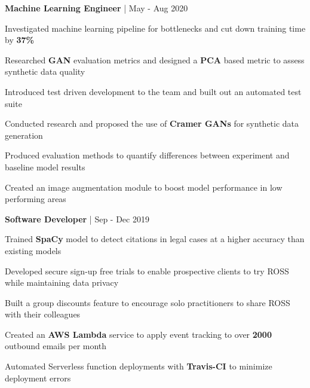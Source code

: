 


\begin{cventries}


\cventry
{\textbf{Machine Learning Engineer} | \color{awesome}{PerkinElmer}}
{May - Aug 2020} %
{ %
\begin{cvitems}
\item {Investigated machine learning pipeline for bottlenecks and cut down training time by \textbf{37\%}}
\item {Researched \textbf{GAN} evaluation metrics and designed a \textbf{PCA} based metric to assess synthetic data quality}
\item {Introduced test driven development to the team and built out an automated test suite}
\item {Conducted research and proposed the use of \textbf{Cramer GANs} for synthetic data generation}
\item {Produced evaluation methods to quantify differences between experiment and baseline model results}
\item {Created an image augmentation module to boost model performance in low performing areas}
\end{cvitems}
}


\cventry
{\textbf{Software Developer} | \color{awesome}{ROSS Intelligence}}
{Sep - Dec 2019} %
{ %
\begin{cvitems}
\item {Trained \textbf{SpaCy} model to detect citations in legal cases at a higher accuracy than existing models}
\item {Developed secure sign-up free trials to enable prospective clients to try ROSS while maintaining data privacy}
\item {Built a group discounts feature to encourage solo practitioners to share ROSS with their colleagues}
\item {Created an \textbf{AWS Lambda} service to apply event tracking to over \textbf{2000} outbound emails per month}
\item {Automated Serverless function deployments with \textbf{Travis-CI} to minimize deployment errors}
\end{cvitems}
}


\end{cventries}
